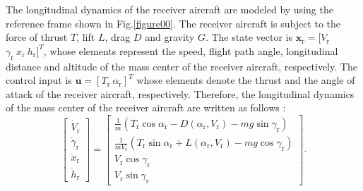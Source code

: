The longitudinal dynamics of the receiver aircraft are modeled by using the
reference frame shown in Fig.\ref{figure00}. The receiver aircraft is
subject to the force of thrust $T$, lift $L$, drag $D$ and gravity $G$. The
state vector is $\mathbf{x}_\text{r}=[V_\text{r}$ $\gamma_\text{r}\ x_\text{r}\ h_\text{r}]^{T}$,
whose elements represent the speed, flight path angle, longitudinal distance
and altitude of the mass center of the receiver aircraft, respectively. The
control input is $\mathbf{u}=[T_\text{r}\ \alpha_\text{r}]^{T}$ whose elements denote
the thrust and the angle of attack of the receiver aircraft, respectively.
Therefore, the longitudinal dynamics of the mass center of the receiver
aircraft are written as follows \cite{17} \cite{22}:%
\begin{equation}
\left[
\begin{array}{c}
\dot{V}_\text{r}  \\
\dot{\gamma}_\text{r} \\
\dot{x}_\text{r} \\
\dot{h}_\text{r}%
\end{array}
\right] =\left[
\begin{array}{c}
\frac{1}{m}\left( T_\text{r}\cos \alpha_\text{r}-D\left( \alpha_\text{r},V_\text{r}\right)
-mg\sin \gamma_\text{r}\right) \\
\frac{1}{mV_\text{r}}\left( T_\text{r}\sin \alpha_\text{r}+L\left( \alpha_\text{r},V_\text{r}\right)
-mg\cos \gamma_\text{r}\right) \\
V_\text{r}\cos \gamma_\text{r} \\
V_\text{r}\sin \gamma_\text{r}%
\end{array}
\right] .  \label{0}
\end{equation}

